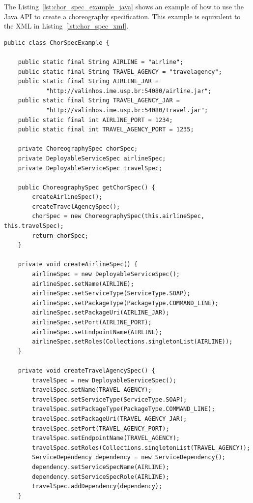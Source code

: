 The Listing~\ref{lst:chor_spec_example_java} shows an example of how to use the Java API to create a choreography specification. This example is equivalent to the XML in Listing~\ref{lst:chor_spec_xml}.

{\footnotesize
\lstset{language=Java}
\begin{lstlisting}[caption=Example of choreography specification using the Java API., label=lst:chor_spec_example_java]
public class ChorSpecExample {

    public static final String AIRLINE = "airline";
    public static final String TRAVEL_AGENCY = "travelagency";
    public static final String AIRLINE_JAR = 
            "http://valinhos.ime.usp.br:54080/airline.jar";
    public static final String TRAVEL_AGENCY_JAR = 
            "http://valinhos.ime.usp.br:54080/travel.jar";
    public static final int AIRLINE_PORT = 1234;
    public static final int TRAVEL_AGENCY_PORT = 1235;

    private ChoreographySpec chorSpec;
    private DeployableServiceSpec airlineSpec;
    private DeployableServiceSpec travelSpec;

    public ChoreographySpec getChorSpec() {
        createAirlineSpec();
        createTravelAgencySpec();
        chorSpec = new ChoreographySpec(this.airlineSpec, this.travelSpec);
        return chorSpec;
    }

    private void createAirlineSpec() {
        airlineSpec = new DeployableServiceSpec();
        airlineSpec.setName(AIRLINE);
        airlineSpec.setServiceType(ServiceType.SOAP);
        airlineSpec.setPackageType(PackageType.COMMAND_LINE);
        airlineSpec.setPackageUri(AIRLINE_JAR);
        airlineSpec.setPort(AIRLINE_PORT);
        airlineSpec.setEndpointName(AIRLINE);
        airlineSpec.setRoles(Collections.singletonList(AIRLINE));
    }

    private void createTravelAgencySpec() {
        travelSpec = new DeployableServiceSpec();
        travelSpec.setName(TRAVEL_AGENCY);
        travelSpec.setServiceType(ServiceType.SOAP);
        travelSpec.setPackageType(PackageType.COMMAND_LINE);
        travelSpec.setPackageUri(TRAVEL_AGENCY_JAR);
        travelSpec.setPort(TRAVEL_AGENCY_PORT);
        travelSpec.setEndpointName(TRAVEL_AGENCY);
        travelSpec.setRoles(Collections.singletonList(TRAVEL_AGENCY));
        ServiceDependency dependency = new ServiceDependency();
        dependency.setServiceSpecName(AIRLINE);
        dependency.setServiceSpecRole(AIRLINE);
        travelSpec.addDependency(dependency);
    }
\end{lstlisting}
}

